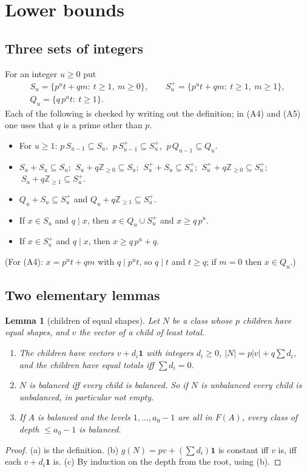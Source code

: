 \documentclass[11pt,a4paper]{amsart}
\newtheorem{lemma}[theorem]{Lemma}
\theoremstyle{definition}
\theoremstyle{remark}
\newcommand{\Z}{\mathbb{Z}}
\newcommand{\one}{\mathbf{1}}
\newcommand{\Sp}{S^{+}}
\begin{document}
\section{Lower bounds}\label{sec:lower}

\subsection{Three sets of integers} For an integer $u\ge0$ put
\begin{gather*} S_u=\{p^ut+qm:\ t\ge1,\ m\ge0\},\qquad \Sp_u=\{p^ut+qm:\ t\ge1,\ m\ge1\},\\ Q_u=\{q\,p^ut:\ t\ge1\}. \end{gather*}
Each of the following is checked by writing out the definition; in (A4) and (A5) one uses that $q$ is a prime
other than $p$.
\begin{itemize}
\item[(A1)] For $u\ge1$: $p\,S_{u-1}\subseteq S_u$, $\ p\,\Sp_{u-1}\subseteq\Sp_u$, $\ p\,Q_{u-1}\subseteq Q_u$.
\item[(A2)] $S_u+S_u\subseteq S_u$; $\ S_u+q\Z_{\ge0}\subseteq S_u$; $\ \Sp_u+S_u\subseteq\Sp_u$;
 $\ \Sp_u+q\Z_{\ge0}\subseteq\Sp_u$; $\ S_u+q\Z_{\ge1}\subseteq\Sp_u$.
\item[(A3)] $Q_u+S_u\subseteq\Sp_u$ and $Q_u+q\Z_{\ge1}\subseteq\Sp_u$.
\item[(A4)] If $x\in S_u$ and $q\mid x$, then $x\in Q_u\cup\Sp_u$ and $x\ge q\,p^u$.
\item[(A5)] If $x\in\Sp_u$ and $q\mid x$, then $x\ge q\,p^u+q$.
\end{itemize}
(For (A4): $x=p^ut+qm$ with $q\mid p^ut$, so $q\mid t$ and $t\ge q$; if $m=0$ then $x\in Q_u$.)

\subsection{Two elementary lemmas}

\begin{lemma}[children of equal shapes]\label{lem:shapes}
Let $N$ be a class whose $p$ children have equal shapes, and $v$ the vector of a child of least total.
\begin{enumerate}
\item[(a)] The children have vectors $v+d_i\one$ with integers $d_i\ge0$, $|N|=p|v|+q\sum d_i$, and the
children have equal totals iff $\sum d_i=0$.
\item[(b)] $N$ is balanced iff every child is balanced. So if $N$ is unbalanced every child is unbalanced, in
particular not empty.
\item[(c)] If $A$ is balanced and the levels $1,\dots,a_0-1$ are all in $F(A)$, every class of depth
$\le a_0-1$ is balanced.
\end{enumerate}
\end{lemma}
\begin{proof}
(a) is the definition. (b) $g(N)=pv+(\sum d_i)\one$ is constant iff $v$ is, iff each $v+d_i\one$ is.
(c) By induction on the depth from the root, using (b).
\end{proof}
\end{document}
